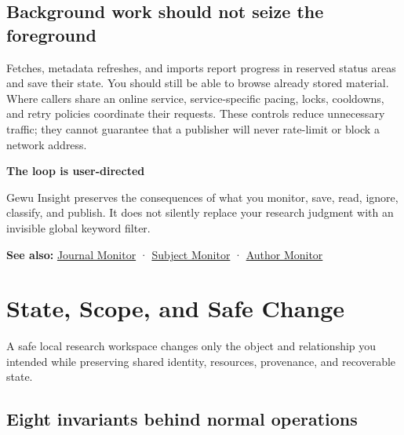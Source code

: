 \documentclass[10pt,letterpaper,oneside]{scrreprt}
\newenvironment{GewuRelated}{\par\nobreak\vspace{3pt}\nobreak\begingroup\small\sffamily\begin{samepage}\noindent}{\par\end{samepage}\endgroup}
\newenvironment{GewuLead}
  {\begin{list}{}{\leftmargin=0pt\rightmargin=0pt\topsep=0pt\partopsep=0pt\parsep=0pt}\item\relax
    \sffamily\fontsize{10.5}{13.2}\selectfont\color{GewuMuted}}
  {\end{list}}
\renewenvironment{quote}
  {\Needspace{5\baselineskip}\begin{tcolorbox}[enhanced,breakable,colback=GewuPale,colframe=GewuPale,boxrule=0pt,
    borderline west={1.6pt}{0pt}{GewuBlue},arc=1.2mm,left=2.5mm,right=2.5mm,top=1.7mm,bottom=1.7mm,
    before skip=4pt,after skip=5pt,fontupper=\color{GewuInk}\small]}
  {\end{tcolorbox}}
\begin{document}
\section{Background work should not seize the foreground}\label{background-work-should-not-seize-the-foreground}

Fetches, metadata refreshes, and imports report progress in reserved status areas and save their state. You should still be able to browse already stored material. Where callers share an online service, service-specific pacing, locks, cooldowns, and retry policies coordinate their requests. These controls reduce unnecessary traffic; they cannot guarantee that a publisher will never rate-limit or block a network address.

\begin{quote}
\textbf{The loop is user-directed}

Gewu Insight preserves the consequences of what you monitor, save, read, ignore, classify, and publish. It does not silently replace your research judgment with an invisible global keyword filter.
\end{quote}

\begin{GewuRelated}
\textbf{See also:} \hyperref[journal-monitor]{Journal Monitor} · \hyperref[subject-monitor]{Subject Monitor} · \hyperref[author-monitor]{Author Monitor}
\end{GewuRelated}

\chapter{State, Scope, and Safe Change}\label{state-and-scope}

\begin{GewuLead}
A safe local research workspace changes only the object and relationship you intended while preserving shared identity, resources, provenance, and recoverable state.
\end{GewuLead}

\section{Eight invariants behind normal operations}\label{eight-invariants-behind-normal-operations}
\end{document}
